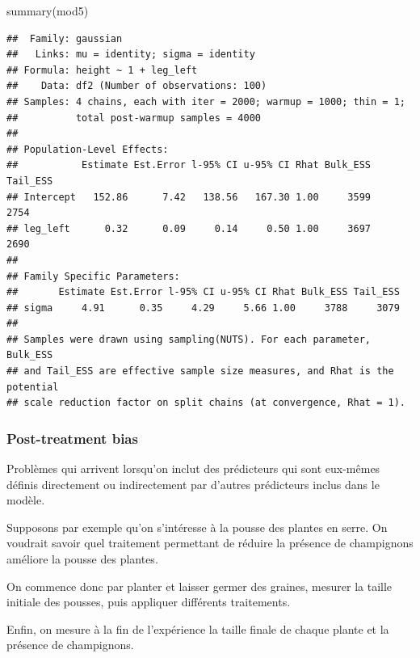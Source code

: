 \documentclass[
  a4paper,11pt,twoside,onecolumn,openright,final,oldfontcommands]{memoir}
\newenvironment{Shaded}{\begin{snugshade}}{\end{snugshade}}
\newcommand{\FunctionTok}[1]{\textcolor[rgb]{0.00,0.00,0.00}{#1}}
\newcommand{\NormalTok}[1]{#1}
\theoremstyle{definition}
\theoremstyle{definition}
\theoremstyle{definition}
\theoremstyle{remark}
\begin{document}
\begin{Shaded}
\begin{Highlighting}[]
\FunctionTok{summary}\NormalTok{(mod5)}
\end{Highlighting}
\end{Shaded}

\begin{verbatim}
##  Family: gaussian 
##   Links: mu = identity; sigma = identity 
## Formula: height ~ 1 + leg_left 
##    Data: df2 (Number of observations: 100) 
## Samples: 4 chains, each with iter = 2000; warmup = 1000; thin = 1;
##          total post-warmup samples = 4000
## 
## Population-Level Effects: 
##           Estimate Est.Error l-95% CI u-95% CI Rhat Bulk_ESS Tail_ESS
## Intercept   152.86      7.42   138.56   167.30 1.00     3599     2754
## leg_left      0.32      0.09     0.14     0.50 1.00     3697     2690
## 
## Family Specific Parameters: 
##       Estimate Est.Error l-95% CI u-95% CI Rhat Bulk_ESS Tail_ESS
## sigma     4.91      0.35     4.29     5.66 1.00     3788     3079
## 
## Samples were drawn using sampling(NUTS). For each parameter, Bulk_ESS
## and Tail_ESS are effective sample size measures, and Rhat is the potential
## scale reduction factor on split chains (at convergence, Rhat = 1).
\end{verbatim}

\hypertarget{post-treatment-bias}{%
\subsubsection{Post-treatment bias}\label{post-treatment-bias}}

Problèmes qui arrivent lorsqu'on inclut des prédicteurs qui sont eux-mêmes définis directement ou indirectement par d'autres prédicteurs inclus dans le modèle.

Supposons par exemple qu'on s'intéresse à la pousse des plantes en serre. On voudrait savoir quel traitement permettant de réduire la présence de champignons améliore la pousse des plantes.

On commence donc par planter et laisser germer des graines, mesurer la taille initiale des pousses, puis appliquer différents traitements.

Enfin, on mesure à la fin de l'expérience la taille finale de chaque plante et la présence de champignons.
\end{document}
